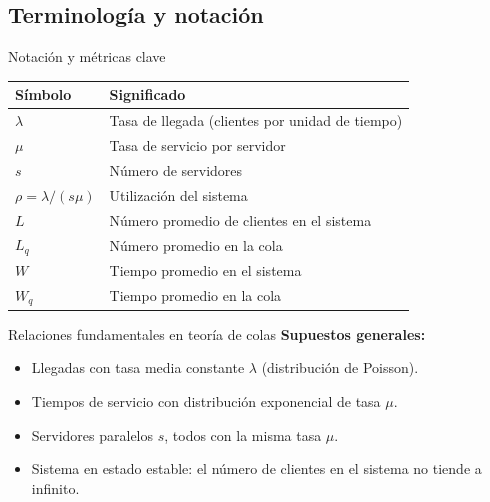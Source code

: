 \documentclass{beamer}
\begin{document}
\subsection{Terminología y notación}
\begin{frame}{Notación y métricas clave}
\begin{table}[]
\centering
\begin{tabular}{@{}ll@{}}
\toprule
\textbf{Símbolo} & \textbf{Significado} \\
\midrule
$\lambda$ & Tasa de llegada (clientes por unidad de tiempo) \\
$\mu$ & Tasa de servicio por servidor \\
$s$ & Número de servidores \\
$\rho = \lambda / (s\mu)$ & Utilización del sistema \\
$L$ & Número promedio de clientes en el sistema \\
$L_q$ & Número promedio en la cola \\
$W$ & Tiempo promedio en el sistema \\
$W_q$ & Tiempo promedio en la cola \\
\bottomrule
\end{tabular}
\end{table}
\end{frame}

\begin{frame}{Relaciones fundamentales en teoría de colas}
\vspace{-0.3cm}
\textbf{Supuestos generales:}
\begin{itemize}
    \item Llegadas con tasa media constante \( \lambda \) (distribución de Poisson).
    \item Tiempos de servicio con distribución exponencial de tasa \( \mu \).
    \item Servidores paralelos \( s \), todos con la misma tasa \( \mu \).
    \item Sistema en estado estable: el número de clientes en el sistema no tiende a infinito.
\end{itemize}
\end{frame}
\end{document}
